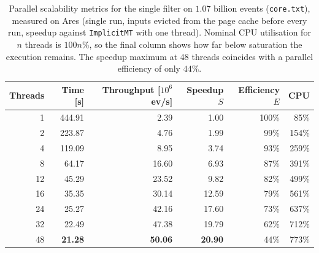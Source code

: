 \begin{table}[htbp]
\centering
\caption{Parallel scalability metrics for the single filter on $1.07$ billion events (\texttt{core.txt}), measured on Ares (single run, inputs evicted from the page cache before every run, speedup against \texttt{ImplicitMT} with one thread). Nominal CPU utilisation for $n$ threads is $100n\%$, so the final column shows how far below saturation the execution remains. The speedup maximum at 48 threads coincides with a parallel efficiency of only $44\%$.}
\label{tab:scalability-filter}
\begin{tabular}{rrrrrr}
\toprule
Threads & Time [s] & Throughput [$10^6$ ev/s] & Speedup $S$ & Efficiency $E$ & CPU \\
\midrule
 1 & 444.91 & 2.39 & 1.00 & 100\% & 85\% \\
 2 & 223.87 & 4.76 & 1.99 & 99\% & 154\% \\
 4 & 119.09 & 8.95 & 3.74 & 93\% & 259\% \\
 8 & 64.17 & 16.60 & 6.93 & 87\% & 391\% \\
12 & 45.29 & 23.52 & 9.82 & 82\% & 499\% \\
16 & 35.35 & 30.14 & 12.59 & 79\% & 561\% \\
24 & 25.27 & 42.16 & 17.60 & 73\% & 637\% \\
32 & 22.49 & 47.38 & 19.79 & 62\% & 712\% \\
48 & \textbf{21.28} & \textbf{50.06} & \textbf{20.90} & 44\% & 773\% \\
\bottomrule
\end{tabular}
\end{table}
